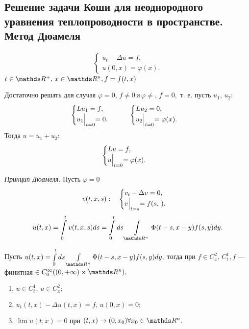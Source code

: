 \subsection{Решение задачи Коши для неоднородного уравнения теплопроводности в пространстве. Метод Дюамеля}
\begin{align}
    \begin{cases} 
        u_t - \Delta u = f, \\
        u (0, x) = \varphi (x).
    \end{cases}
\label{heatnonhomcauchy2}
\end{align}
$t \in \real^+,\, x \in \real^n, f=f(t,x)$

\begin{note}

Достаточно решать для случая $\varphi = 0, \, f \not= 0 \, \text{и} \, \varphi \not=, \, f = 0,$ т. е. пусть $u_1, \, u_2 :$
\begin{equation*}
\begin{cases} 
        Lu_1 = f, \\
        u_1\Bigl|_{t=0} = 0.
    \end{cases}
    \qquad
    \begin{cases} 
        Lu_2 = 0, \\
        u_2\Bigl|_{t=0} = \varphi (x).
    \end{cases}
\end{equation*}
Тогда $u = u_1+u_2:$
\begin{align}
\begin{cases} 
        Lu = f, \\
        u\Bigl|_{t=0} = \varphi (x).
    \end{cases}
    \end{align}
\end{note}

{\itshape Принцип Дюамеля.} Пусть $\varphi = 0$
\begin{equation*}
v(t,x,s) : \quad
    \begin{cases} 
        v_t - \Delta v = 0, \\
        v\Bigl|_{t=s} = f(s, \,).
    \end{cases}
\end{equation*}
$$u(t,x) = \int\limits_0^tv(t,x,s)ds = \int\limits_0^t ds \int\limits_{\real^n}\Phi(t-s, x-y)f(s,y)dy.$$

\begin{theorem}
Пусть $ u(t,x) = \int\limits_0^t ds \int\limits_{\real^n}\Phi(t-s, x-y)f(s,y)dy,$ тогда при $f\in C_x^2, \, C_t^1, f $ --- финитная $\in C_0^\infty( (0,+\infty) \times \real^n),$
\begin{enumerate}
\item $u \in C_t^1, \, u \in C_x^2;$
\item $u_t(t,x) - \Delta u(t,x) = f, \, u(0,x) = 0;$
\item $\lim u(t,x) = 0$ при $(t,x) \rightarrow (0,x_0) \forall x_0 \in \real^n.$
\end{enumerate}
\end{theorem}

